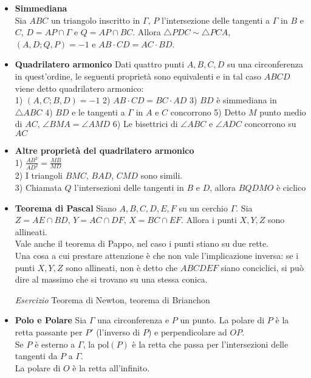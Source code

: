 \begin{itemize}
\item \textbf{Simmediana}\\
Sia $ABC$ un triangolo inscritto in $\Gamma$, $P$ l'intersezione delle tangenti a $\Gamma$ in $B$ e $C$, $D=AP\cap \Gamma$ e $Q=AP\cap BC$. Allora $\triangle PDC \sim \triangle PCA$, $(A,D;Q,P)=-1$ e $AB\cdot CD=AC\cdot BD$.

\item \textbf{Quadrilatero armonico}
Dati quattro punti $A,B,C,D$ su una circonferenza in quest'ordine, le seguenti proprietà sono equivalenti e in tal caso $ABCD$ viene detto quadrilatero armonico:\\
1) $(A,C;B,D)=-1$ \hspace{0.2cm} 2) $AB\cdot CD= BC\cdot AD$ \hspace{0.2cm} 3) $BD$ è simmediana in $\triangle ABC$ 4) $BD$ e le tangenti a $\Gamma$ in $A$ e $C$ concorrono \hspace{0.2cm}
5) Detto $M$ punto medio di $AC$, $\angle BMA=\angle AMD$  \hspace{0.2cm} 6) Le bisettrici di $\angle ABC$ e $\angle ADC$ concorrono su $AC$  

\item \textbf{Altre proprietà del quadrilatero armonico}\\
1) $\frac{AB^2}{AD^2}=\frac{MB}{MD}$\\
2) I triangoli $BMC$, $BAD$, $CMD$ sono simili.\\
3) Chiamata $Q$ l'intersezioni delle tangenti in $B$ e $D$, allora $BQDMO$ è ciclico

\item \textbf{Teorema di Pascal}
Siano $A,B,C,D,E,F$ su un cerchio $\Gamma$. Sia $Z=AE\cap BD$, $Y=AC\cap DF$, $X=BC\cap EF$. Allora i punti $X,Y,Z$ sono allineati.\\
Vale anche il teorema di Pappo, nel caso i punti stiano su due rette. \\
Una cosa a cui prestare attenzione è che non vale l'implicazione inversa: se i punti $X,Y,Z$ sono allineati, non è detto che $ABCDEF$ siano conciclici, si può dire al massimo che si trovano su una stessa conica.

\emph{Esercizio} Teorema di Newton, teorema di Brianchon

\item \textbf{Polo e Polare}
Sia $\Gamma$ una circonferenza e $P$ un punto. La polare di $P$ è la retta passante per $P'$ (l'inverso di $P$) e perpendicolare ad $OP$. \\
Se $P$ è esterno a $\Gamma$, la $\text{pol}(P)$ è la retta che passa per l'intersezioni delle tangenti da $P$ a $\Gamma$. \\
La polare di $O$ è la retta all'infinito.


\end{itemize}
